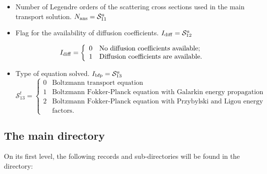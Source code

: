 \begin{itemize}
\item Number of Legendre orders of the scattering cross sections used in the
main transport solution. $N_{\rm ans}=\mathcal{S}^{a}_{11}$

\item Flag for the availability of diffusion coefficients. $I_{\rm diff}=\mathcal{S}^{a}_{12}$

\begin{displaymath}
I_{\rm diff} = \left\{
\begin{array}{rl}
 0 & \textrm{No diffusion coefficients available;} \\
 1 & \textrm{Diffusion coefficients are available.}
\end{array} \right.
\end{displaymath}

\item Type of equation solved. $I_{\rm bfp}=\mathcal{S}^{a}_{13}$
\begin{displaymath}
\mathcal{S}^{t}_{13} = \left\{
\begin{array}{rl}
 0 & \textrm{Boltzmann transport equation} \\
 1 & \textrm{Boltzmann Fokker-Planck equation with Galarkin energy propagation factors} \\
 2 & \textrm{Boltzmann Fokker-Planck equation with Przybylski and Ligou energy propagation} \\
  & \textrm{factors.}
\end{array} \right.
\end{displaymath}

\end{itemize}

\subsection{The main  directory}\label{sect:asminfodirmain}

On its first level, the
following records and sub-directories will be found in the  directory:

